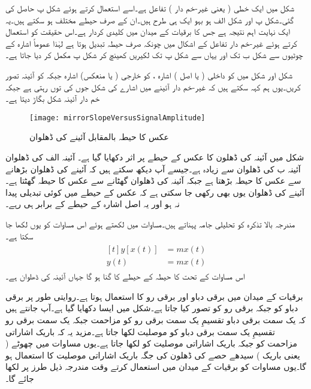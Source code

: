 شکل   میں  ایک خطی ( یعنی غیر-خم دار ) تفاعل ہے۔اسے استعمال کرتے ہوئے شکل  پ حاصل کی گئی۔شکل  پ اور شکل  الف ہو بہو ایک ہی طرح ہیں۔ان کے صرف حیطے مختلف ہو سکتے ہیں۔یہ ایک نہایت اہم نتیجہ ہے جس کا برقیات کے میدان میں کلیدی کردار ہے۔اس حقیقت کو استعمال کرتے ہوئے غیر-خم دار تفاعل کے اشکال میں چونکہ صرف حیطہ تبدیل ہوتا ہے لہٰذا عموماً اشارہ    کے چوٹیوں سے شکل  ب تک اور یہاں سے شکل  پ تک لکیریں کھینچ کر شکل  پ مکمل کر دیا جاتا ہے۔

شکل   اور شکل   میں  کو داخلی ( یا اصل ) اشارہ ،  کو خارجی ( یا منعکس) اشارہ جبکہ   کو آئینہ تصور کریں۔یوں ہم کہہ سکتے ہیں کہ غیر-خم دار آئینے میں اشارے کی شکل جوں کی توں رہتی ہے جبکہ خم دار آئینہ شکل بگاڑ دیتا ہے۔
\begin{figure}
\centering
\texttt{[image: mirrorSlopeVersusSignalAmplitude]}
\caption{عکس کا حیطہ بالمقابل آئینے کی ڈھلوان}
\label{شکل_عکس_کا_حیطہ_بالمقابل_ڈھلوان}
\end{figure}
شکل   میں آئینہ کی ڈھلون کا عکس کے حیطے پر اثر دکھایا گیا ہے۔ آئینہ  الف کی ڈھلوان آئینہ  ب کی ڈھلوان سے زیادہ ہے۔جیسے آپ دیکھ سکتے ہیں کہ آئینے کی ڈھلوان بڑھانے سے عکس کا حیطہ بڑھتا ہے جبکہ آئینہ کی ڈھلوان گھٹانے سے عکس کا حیطہ گھٹتا ہے۔آئینے کی ڈھلوان یوں بھی رکھی جا سکتی ہے کہ عکس کے حیطے میں کوئی تبدیلی پیدا نہ ہو اور یہ اصل اشارہ کے حیطے کے برابر ہی رہے۔

مندرجہ بالا تذکرہ کو تحلیلی جامہ پہناتے ہیں۔مساوات   میں   لکھتے ہوئے اس مساوات کو یوں لکھا جا سکتا ہے۔
\begin{gather}
\begin{aligned}[t]
y [x(t)]&=m x(t)\\
y(t)&=m x(t)
\end{aligned}
\end{gather}
اس مساوات کے تحت  کا حیطہ  کے حیطے کا  گنا ہو گا جہاں  آئینہ کی ڈھلوان ہے۔

برقیات کے میدان میں برقی دباو   اور برقی رو   کا استعمال ہوتا ہے۔روایتی طور پر برقی دباو کو  جبکہ برقی رو کو  تصور کیا جاتا ہے۔شکل   میں ایسا دکھایا گیا ہے۔آپ جانتے ہیں کہ  یک سمت برقی دباو تقسیمِ یک سمت برقی رو کو مزاحمت  جبکہ یک سمت برقی رو تقسیمِ یک سمت برقی دباو کو موصلیت  لکھا جاتا ہے۔مزید یہ کہ باریک اشاراتی مزاحمت کو  جبکہ باریک اشاراتی موصلیت کو  لکھا جاتا ہے۔یوں مساوات    میں چھوٹے ( یعنی باریک ) سیدھے حصے کی ڈھلون   کی جگہ باریک اشاراتی موصلیت   کا استعمال ہو گا۔یوں مساوات   کو برقیات کے میدان میں استعمال کرتے وقت مندرجہ ذیل طرز پر لکھا جائے گا۔

